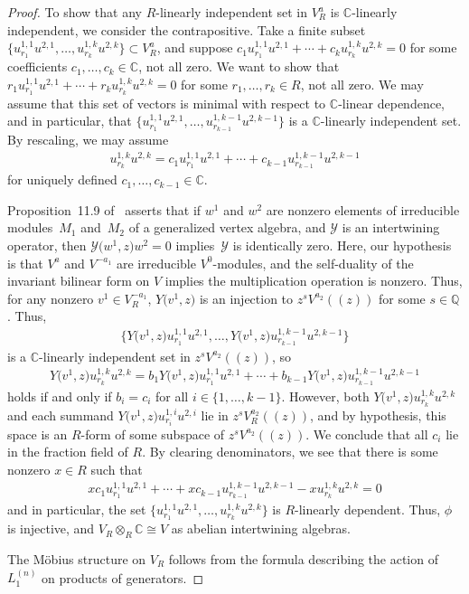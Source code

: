 \documentclass[pdftex]{sigma}
\newcommand{\bC}{\mathbb{C}}
\newcommand{\bQ}{\mathbb{Q}}
\newcommand{\cY}{\mathcal{Y}}
\theoremstyle{definition}
\begin{document}
\begin{proof}
To show that any $R$-linearly independent set in $V^a_R$ is $\bC$-linearly independent, we consider the contrapositive. Take a finite subset $\big\{ u^{1,1}_{r_1}u^{2,1},\ldots, u^{1,k}_{r_k} u^{2,k} \big\} \subset V^a_R$, and suppose $c_1 u^{1,1}_{r_1}u^{2,1} + \cdots + c_k u^{1,k}_{r_k} u^{2,k} = 0$ for some coefficients $c_1,\ldots,c_k \in \bC$, not all zero. We want to show that $r_1 u^{1,1}_{r_1}u^{2,1} + \cdots + r_k u^{1,k}_{r_k} u^{2,k} = 0$ for some $r_1,\ldots,r_k \in R$, not all zero. We may assume that this set of vectors is minimal with respect to $\bC$-linear dependence, and in particular, that $\big\{ u^{1,1}_{r_1}u^{2,1},\ldots, u^{1,k-1}_{r_{k-1}} u^{2,k-1} \big\}$ is a $\bC$-linearly independent set. By rescaling, we may assume
\begin{gather*} u^{1,k}_{r_k} u^{2,k} = c_1 u^{1,1}_{r_1}u^{2,1} + \cdots + c_{k-1} u^{1,k-1}_{r_{k-1}} u^{2,k-1} \end{gather*}
for uniquely defined $c_1,\ldots, c_{k-1} \in \bC$.

Proposition~11.9 of~\cite{DL93} asserts that if $w^1$ and $w^2$ are nonzero elements of irreducible mo\-dules~$M_1$ and~$M_2$ of a generalized vertex algebra, and $\cY$ is an intertwining operator, then $\cY\big(w^1,z\big)w^2 = 0$ implies~$\cY$ is identically zero. Here, our hypothesis is that $V^a$ and $V^{-a_1}$ are irreducible $V^0$-modules, and the self-duality of the invariant bilinear form on $V$ implies the multiplication operation is nonzero. Thus, for any nonzero $v^1 \in V^{-a_1}_R$, $Y\big(v^1,z\big)$ is an injection to $z^s V^{a_2}((z))$ for some $s \in \bQ$. Thus,
\begin{gather*} \big\{ Y\big(v^1,z\big) u^{1,1}_{r_1}u^{2,1}, \ldots, Y\big(v^1,z\big) u^{1,k-1}_{r_{k-1}} u^{2,k-1} \big\} \end{gather*}
is a $\bC$-linearly independent set in $z^s V^{a_2}((z))$, so
\begin{gather*} Y\big(v^1,z\big) u^{1,k}_{r_k} u^{2,k} = b_1 Y\big(v^1,z\big) u^{1,1}_{r_1}u^{2,1} + \cdots + b_{k-1} Y\big(v^1,z\big) u^{1,k-1}_{r_{k-1}} u^{2,k-1} \end{gather*}
holds if and only if $b_i = c_i$ for all $i \in \{1,\ldots,k-1\}$. However, both $Y\big(v^1,z\big) u^{1,k}_{r_k} u^{2,k}$ and each summand $Y\big(v^1,z\big) u^{1,i}_{r_i}u^{2,i}$ lie in $z^sV^{a_2}_R((z))$, and by hypothesis, this space is an $R$-form of some subspace of $z^sV^{a_2}((z))$. We conclude that all $c_i$ lie in the fraction field of $R$. By clearing denominators, we see that there is some nonzero $x \in R$ such that
\begin{gather*} xc_1 u^{1,1}_{r_1}u^{2,1} + \cdots + xc_{k-1} u^{1,k-1}_{r_{k-1}} u^{2,k-1} - x u^{1,k}_{r_k} u^{2,k} = 0 \end{gather*}
and in particular, the set $\big\{ u^{1,1}_{r_1}u^{2,1},\ldots, u^{1,k}_{r_k} u^{2,k} \big\}$ is $R$-linearly dependent. Thus, $\phi$ is injective, and $V_R \otimes_{R} \bC \cong V$ as abelian intertwining algebras.

The M\"obius structure on $V_R$ follows from the formula describing the action of $L_1^{(n)}$ on products of generators.
\end{proof}
\end{document}

